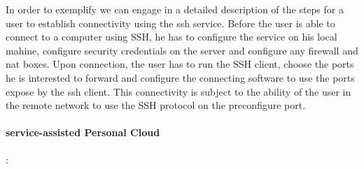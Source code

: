 In order to exemplify we can engage in a detailed description of the steps for a
user to establish connectivity using the ssh service. Before the user is able to
connect to a computer using SSH, he has to configure the service on his local
mahine, configure security credentials on the server and configure any firewall
and nat boxes. Upon connection, the user has to run the SSH client, choose the
ports he is interested to forward and configure the connecting software to use
the ports expose by the ssh client. This connectivity is subject to the ability
of the user in the remote network to use the SSH protocol on the preconfigure
port. 


\paragraph*{service-assisted Personal Cloud}:



